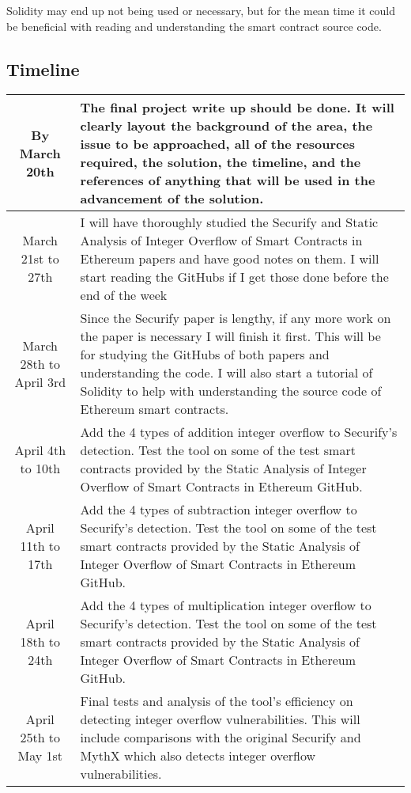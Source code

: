 \documentclass{article}
\begin{document}
Solidity may end up not being used or necessary, but for the mean time it could be beneficial with reading and understanding the smart contract source code.

\subsection{Timeline}

\begin{tabular}{|c|p{4in}|}
\hline
By March 20th           & The final project write up should be done. It will clearly layout the background of the area, the issue to be approached, all of the resources required, the solution, the timeline, and the references of anything that will be used in the advancement of the solution.                                 \\ \hline
March 21st to 27th      & I will have thoroughly studied the Securify and Static Analysis of Integer Overflow of Smart Contracts in Ethereum papers and have good notes on them. I will start reading the GitHubs if I get those done before the end of the week                                                                    \\ \hline
March 28th to April 3rd & Since the Securify paper is lengthy, if any more work on the paper is necessary I will finish it first. This will be for studying the GitHubs of both papers and understanding the code. I will also start a tutorial of Solidity to help with understanding the source code of Ethereum smart contracts. \\ \hline
April 4th to 10th       & Add the 4 types of addition integer overflow to Securify's detection. Test the tool on some of the test smart contracts provided by the Static Analysis of Integer Overflow of Smart Contracts in Ethereum GitHub.                                                                                        \\ \hline
April 11th to 17th      & Add the 4 types of subtraction integer overflow to Securify's detection. Test the tool on some of the test smart contracts provided by the Static Analysis of Integer Overflow of Smart Contracts in Ethereum GitHub.                                                                                     \\ \hline
April 18th to 24th      & Add the 4 types of multiplication integer overflow to Securify's detection. Test the tool on some of the test smart contracts provided by the Static Analysis of Integer Overflow of Smart Contracts in Ethereum GitHub.                                                                                  \\ \hline
April 25th to May 1st   & Final tests and analysis of the tool's efficiency on detecting integer overflow vulnerabilities. This will include comparisons with the original Securify and MythX which also detects integer overflow vulnerabilities.                                                                                  \\ \hline
\end{tabular}

\printbibliography
\end{document}
